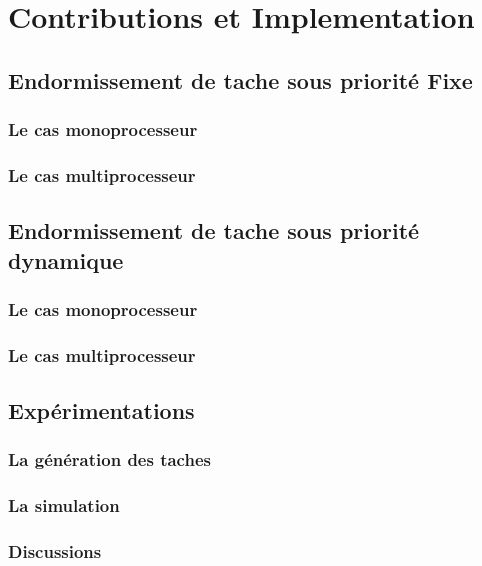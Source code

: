 \part{Contributions et Implementation}
\chapter{Endormissement de tache sous priorité Fixe}
\minitoc
\section{Le cas monoprocesseur}
\section{Le cas multiprocesseur}
\chapter{Endormissement de tache sous priorité dynamique}
\minitoc
\section{Le cas monoprocesseur}
\section{Le cas multiprocesseur}
\chapter{Expérimentations}
\section{La génération des taches}
\section{La simulation}
\section{Discussions}